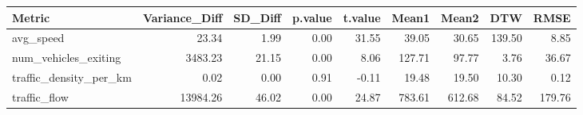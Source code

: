 \begin{table}[ht]
\centering
\begin{tabular}{lrrrrrrrr}
  \hline
Metric & Variance\_Diff & SD\_Diff & p.value & t.value & Mean1 & Mean2 & DTW & RMSE \\ 
  \hline
avg\_speed & 23.34 & 1.99 & 0.00 & 31.55 & 39.05 & 30.65 & 139.50 & 8.85 \\ 
  num\_vehicles\_exiting & 3483.23 & 21.15 & 0.00 & 8.06 & 127.71 & 97.77 & 3.76 & 36.67 \\ 
  traffic\_density\_per\_km & 0.02 & 0.00 & 0.91 & -0.11 & 19.48 & 19.50 & 10.30 & 0.12 \\ 
  traffic\_flow & 13984.26 & 46.02 & 0.00 & 24.87 & 783.61 & 612.68 & 84.52 & 179.76 \\ 
   \hline
\end{tabular}
\end{table}
